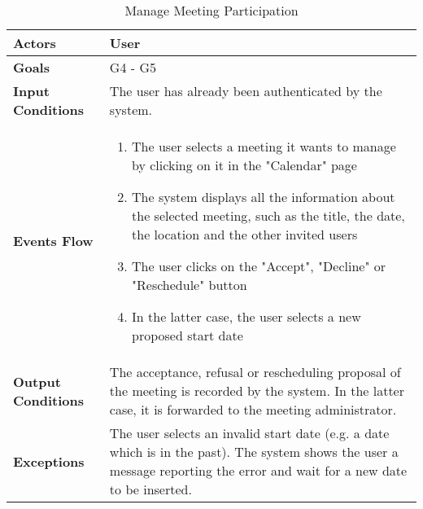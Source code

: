 \begin{table}[H]
	\centering
	\def\arraystretch{1.5}
	\begin{tabular}{|p{7cm}|p{7cm}|}
		\hline
		\textbf{Actors}            & User		    \\ \hline
		\textbf{Goals}             & G4 - G5           \\ \hline
		\textbf{Input Conditions}  & The user has already been authenticated by the system.           \\ \hline
		\textbf{Events Flow}       & 
			\begin{enumerate}[topsep=0pt, leftmargin=*]
				\item The user selects a meeting it wants to manage by clicking on it in the "Calendar" page
				\item The system displays all the information about the selected meeting, such as the title, the date, the location and the other invited users
				\item The user clicks on the "Accept", "Decline" or "Reschedule" button
				\item In the latter case, the user selects a new proposed start date
			\end{enumerate}           \\ \hline
		\textbf{Output Conditions} & The acceptance, refusal or rescheduling proposal of the meeting is recorded by the system. In the latter case, it is forwarded to the meeting administrator.           \\ \hline
		\textbf{Exceptions}        & The user selects an invalid start date (e.g. a date which is in the past). The system shows the user a message reporting the error and wait for a new date to be inserted.           \\ \hline
	\end{tabular}
	\caption{Manage Meeting Participation}
\end{table}

